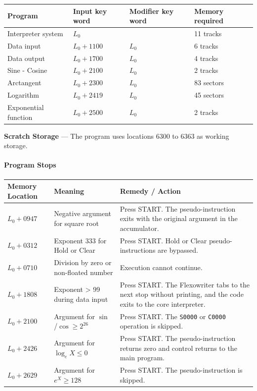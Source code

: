 \begin{center}
\small
\begin{tabular}{llll}
\toprule
\textbf{Program} & \textbf{Input key word} & \textbf{Modifier key word} & \textbf{Memory required} \\
\midrule Interpreter system & $L_0$      &   & 11 tracks \\
Data input           & $L_0+1100$ & $L_0$ & 6 tracks \\
Data output          & $L_0+1700$ & $L_0$ & 4 tracks \\
Sine - Cosine        & $L_0+2100$ & $L_0$ & 2 tracks \\
Arctangent           & $L_0+2300$ & $L_0$ & 83 sectors \\
Logarithm            & $L_0+2419$ & $L_0$ & 45 sectors \\
Exponential function & $L_0+2500$ & $L_0$ & 2 tracks \\
\bottomrule
\end{tabular}
\end{center}

\textbf{Scratch Storage} --- The program uses locations 6300 to 6363 as working storage.

\paragraph{Program Stops}
\begin{center}
\small
\begin{tabularx}{\textwidth}{l p{4.5cm} X}
\toprule
\textbf{Memory Location} & \textbf{Meaning} & \textbf{Remedy / Action} \\
\midrule
$L_0+0947$ & Negative argument for square root & Press \textsf{START}. The pseudo-instruction exits with the original argument in the accumulator. \\
\midrule
$L_0+0312$ & Exponent 333 for Hold or Clear & Press \textsf{START}. Hold or Clear pseudo-instructions are bypassed. \\
\midrule
$L_0+0710$ & Division by zero or non-floated number & Execution cannot continue. \\
\midrule
$L_0+1808$ & Exponent > 99 during data input & Press \textsf{START}. The Flexowriter tabs to the next stop without printing, and the code exits to the core interpreter. \\
\midrule
$L_0+2100$ & Argument for $\sin$/$\cos \ge 2^{26}$ & Press \textsf{START}. The \texttt{S0000} or \texttt{C0000} operation is skipped. \\
\midrule
$L_0+2426$ & Argument for $\log_e X \le 0$ & Press \textsf{START}. The pseudo-instruction returns zero and control returns to the main program. \\
\midrule
$L_0+2629$ & Argument for $e^X \ge 128$ & Press \textsf{START}. The pseudo-instruction is skipped. \\
\bottomrule
\end{tabularx}
\end{center}

